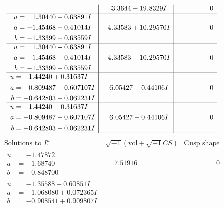 \documentclass[1p]{elsarticle_modified}
\theoremstyle{definition}
\newcommand{\I}{\sqrt{-1}}
\begin{document}
$$\begin{array}{c|c|c}
 & \phantom{-}3.3644 - 19.8329 I & \phantom{-0.000000 } 0 \\ \hline\begin{aligned}
u &= \phantom{-}1.30440 + 0.63891 I \\
a &= -1.45468 + 0.41014 I \\
b &= -1.33399 - 0.63559 I\end{aligned}
 & \phantom{-}4.33583 + 10.29570 I & \phantom{-0.000000 } 0 \\ \hline\begin{aligned}
u &= \phantom{-}1.30440 - 0.63891 I \\
a &= -1.45468 - 0.41014 I \\
b &= -1.33399 + 0.63559 I\end{aligned}
 & \phantom{-}4.33583 - 10.29570 I & \phantom{-0.000000 } 0 \\ \hline\begin{aligned}
u &= \phantom{-}1.44240 + 0.31637 I \\
a &= -0.809487 + 0.607107 I \\
b &= -0.642803 - 0.062231 I\end{aligned}
 & \phantom{-}6.05427 + 0.44106 I & \phantom{-0.000000 } 0 \\ \hline\begin{aligned}
u &= \phantom{-}1.44240 - 0.31637 I \\
a &= -0.809487 - 0.607107 I \\
b &= -0.642803 + 0.062231 I\end{aligned}
 & \phantom{-}6.05427 - 0.44106 I & \phantom{-0.000000 } 0\\
 \hline 
 \end{array}$$\newpage$$\begin{array}{c|c|c}  
\text{Solutions to }I^u_{1}& \I (\text{vol} + \sqrt{-1}CS) & \text{Cusp shape}\\
 \hline 
\begin{aligned}
u &= -1.47872\phantom{ +0.000000I} \\
a &= -1.68740\phantom{ +0.000000I} \\
b &= -0.848700\phantom{ +0.000000I}\end{aligned}
 & \phantom{-}7.51916\phantom{ +0.000000I} & \phantom{-0.000000 } 0 \\ \hline\begin{aligned}
u &= -1.35588 + 0.60851 I \\
a &= -1.068080 + 0.072365 I \\
b &= -0.908541 + 0.909807 I\end{aligned}

\end{array}$$
\end{document}
